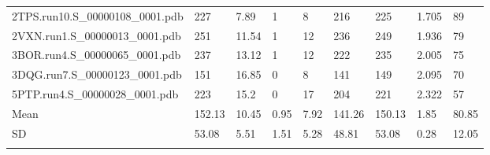 \documentclass{bioinfo}
\begin{document}
\begin{table}[!t]
{\begin{tabular}{lllllllll}
    2TPS.run10.S\_00000108\_0001.pdb & 227      & 7.89       & 1           & 8           & 216         & 225     & 1.705           & 89           \\
    2VXN.run1.S\_00000013\_0001.pdb & 251      & 11.54      & 1           & 12          & 236         & 249     & 1.936           & 79           \\
    3BOR.run4.S\_00000065\_0001.pdb & 237      & 13.12      & 1           & 12          & 222         & 235     & 2.005           & 75           \\
    3DQG.run7.S\_00000123\_0001.pdb & 151      & 16.85      & 0           & 8           & 141         & 149     & 2.095           & 70           \\
    5PTP.run4.S\_00000028\_0001.pdb & 223      & 15.2       & 0           & 17          & 204         & 221     & 2.322           & 57           \\ \midrule
    Mean                           & 152.13   & 10.45      & 0.95        & 7.92        & 141.26      & 150.13  & 1.85            & 80.85        \\
    SD                             & 53.08    & 5.51       & 1.51        & 5.28        & 48.81       & 53.08   & 0.28            & 12.05        \\ \botrule
\end{tabular}}{}
\end{table}
\end{document}
